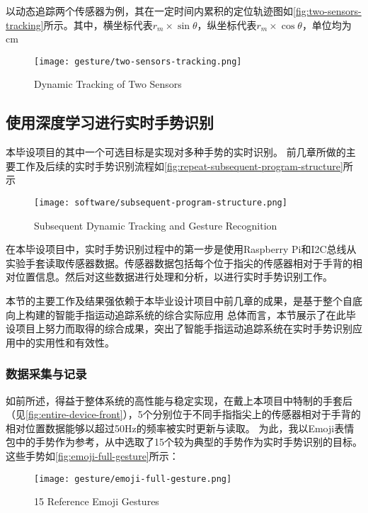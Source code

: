以动态追踪两个传感器为例，其在一定时间内累积的定位轨迹图如\autoref{fig:two-sensors-tracking}所示。其中，横坐标代表$r_m \times \sin{\theta}$，纵坐标代表$r_m \times \cos{\theta}$，单位均为cm

\begin{figure}[H]
    \centering
    \texttt{[image: gesture/two-sensors-tracking.png]}
    \caption{\label{fig:two-sensors-tracking}Dynamic Tracking of Two Sensors}
\end{figure}


\subsection{使用深度学习进行实时手势识别}
本毕设项目的其中一个可选目标是实现对多种手势的实时识别。
前几章所做的主要工作及后续的实时手势识别流程如\autoref{fig:repeat-subsequent-program-structure}所示

\begin{figure}[H]
    \centering
    \texttt{[image: software/subsequent-program-structure.png]}
    \caption{\label{fig:repeat-subsequent-program-structure}Subsequent Dynamic Tracking and Gesture Recognition}
\end{figure}

在本毕设项目中，实时手势识别过程中的第一步是使用Raspberry Pi和I2C总线从实验手套读取传感器数据。传感器数据包括每个位于指尖的传感器相对于手背的相对位置信息。然后对这些数据进行处理和分析，以进行实时手势识别工作。

本节的主要工作及结果强依赖于本毕业设计项目中前几章的成果，是基于整个自底向上构建的智能手指运动追踪系统的综合实际应用
总体而言，本节展示了在此毕设项目上努力而取得的综合成果，突出了智能手指运动追踪系统在实时手势识别应用中的实用性和有效性。

\subsubsection{数据采集与记录}
如前所述，得益于整体系统的高性能与稳定实现，在戴上本项目中特制的手套后（见\autoref{fig:entire-device-front}），5个分别位于不同手指指尖上的传感器相对于手背的相对位置数据能够以超过50Hz的频率被实时更新与读取。
为此，我以Emoji表情包中的手势作为参考，从中选取了15个较为典型的手势作为实时手势识别的目标。这些手势如\autoref{fig:emoji-full-gesture}所示：

\begin{figure}[H]
    \centering
    \texttt{[image: gesture/emoji-full-gesture.png]}
    \caption{\label{fig:emoji-full-gesture}15 Reference Emoji Gestures}
\end{figure}


